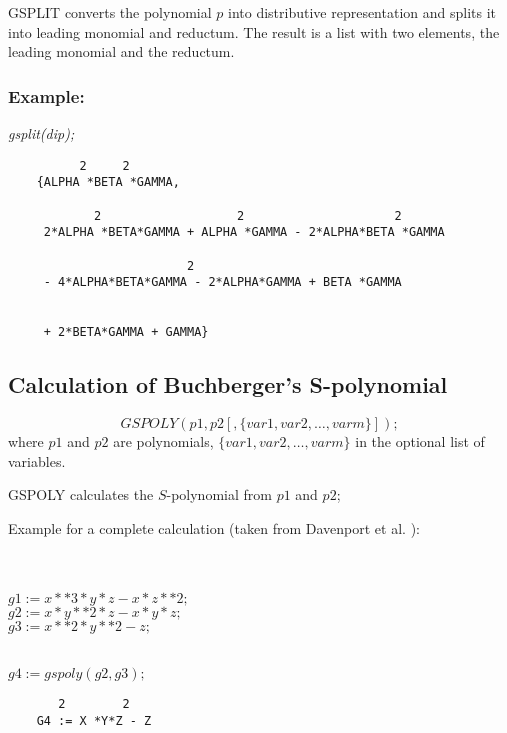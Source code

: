 GSPLIT converts the polynomial $p$ into distributive representation
and splits it into leading monomial and reductum. The result is a list
with two elements, the leading monomial and the reductum.

\subsubsection*{Example:}
{\it gsplit(dip); }
\begin{verbatim}
          2     2
    {ALPHA *BETA *GAMMA,

            2                   2                     2
     2*ALPHA *BETA*GAMMA + ALPHA *GAMMA - 2*ALPHA*BETA *GAMMA

                         2
     - 4*ALPHA*BETA*GAMMA - 2*ALPHA*GAMMA + BETA *GAMMA


     + 2*BETA*GAMMA + GAMMA}

 \end{verbatim}

\subsection{Calculation of Buchberger's S-polynomial}
\[
GSPOLY (p1,p2[,\{var1, var2, \ldots , varm\}]);
\]
where $p1$  and $p2$ are polynomials, $\{var1, var2, \ldots ,
varm\}$ in the optional list of variables.

GSPOLY calculates the $S$-polynomial from $p1$  and $p2$;

Example for a complete calculation (taken from {\sc Davenport et al.}
 \cite{DAST88}):

\hspace*{+1cm}{\it \%  initial system} \\
\hspace*{+1cm}{\it korder x,y,z; torder lex;} \\
\hspace*{+1cm} $g1  :=  x**3*y*z - x*z**2;$\\
\hspace*{+1cm} $g2  :=  x*y**2*z - x*y*z; $ \\
\hspace*{+1cm} $g3  :=  x**2*y**2 - z;$

\hspace*{+1cm}{\it \% first S-polynomial} \\
\hspace*{+1cm} $g4  :=  gspoly(g2,g3);$

\begin{verbatim}
       2        2
    G4 := X *Y*Z - Z
 \end{verbatim}

